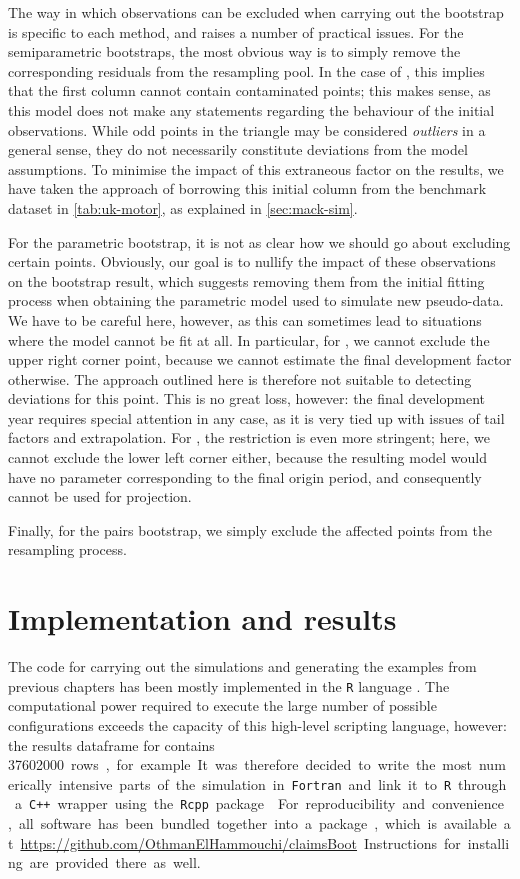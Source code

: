 \documentclass[a4paper]{book}
\begin{document}
The way in which observations can be excluded when carrying out the bootstrap is specific to each method, and raises a number of practical issues. For the semiparametric bootstraps, the most obvious way is to simply remove the corresponding residuals from the resampling pool. In the case of , this implies that the first column cannot contain contaminated points; this makes sense, as this model does not make any statements regarding the behaviour of the initial observations. While odd points in the triangle may be considered \emph{outliers} in a general sense, they do not necessarily constitute deviations from the model assumptions. To minimise the impact of this extraneous factor on the results, we have taken the approach of borrowing this initial column from the benchmark dataset in \cref{tab:uk-motor}, as explained in \cref{sec:mack-sim}.

For the parametric bootstrap, it is not as clear how we should go about excluding certain points. Obviously, our goal is to nullify the impact of these observations on the bootstrap result, which suggests removing them from the initial fitting process when obtaining the parametric model used to simulate new pseudo-data. We have to be careful here, however, as this can sometimes lead to situations where the model cannot be fit at all. In particular, for , we cannot exclude the upper right corner point, because we cannot estimate the final development factor otherwise. The approach outlined here is therefore not suitable to detecting deviations for this point. This is no great loss, however: the final development year requires special attention in any case, as it is very tied up with issues of tail factors and extrapolation. For , the restriction is even more stringent; here, we cannot exclude the lower left corner either, because the resulting model would have no parameter corresponding to the final origin period, and consequently cannot be used for projection.

Finally, for the pairs bootstrap, we simply exclude the affected points from the resampling process.

\section{Implementation and results}

The code for carrying out the simulations and generating the examples from previous chapters has been mostly implemented in the \texttt{R} language \cite{R}. The computational power required to execute the large number of possible configurations exceeds the capacity of this high-level scripting language, however: the results dataframe for  contains \SI{37602000} rows, for example. It was therefore decided to write the most numerically intensive parts of the simulation in \texttt{Fortran} and link it to \texttt{R} through a \texttt{C++} wrapper using the \texttt{Rcpp} package \cite{eddelbuettel}. For reproducibility and convenience, all software has been bundled together into a package, which is available at \url{https://github.com/OthmanElHammouchi/claimsBoot}. Instructions for installing are provided there as well.
\end{document}
